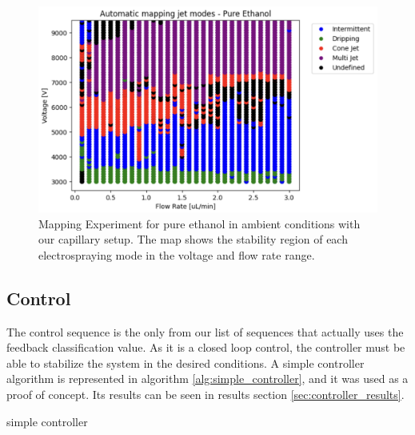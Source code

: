     \begin{figure}[H]
        \center
        \includegraphics[width=15cm]{Figuras/report4/map-2023-03-02.png}
        \caption{Mapping Experiment for pure ethanol in ambient conditions with our capillary setup. The map shows the stability region of each electrospraying mode in the voltage and flow rate range.}
        \label{fig:map3Data_fig}
    \end{figure}



\subsection{Control}

    The control sequence is the only from our list of sequences that actually uses the feedback classification value. 
    As it is a closed loop control, the controller must be able to stabilize the system in the desired conditions.
    A simple controller algorithm is represented in algorithm \ref{alg:simple_controller}, and it was used as a proof of concept.
    Its results can be seen in results section \ref{sec:controller_results}.

    \begin{algorithm}
        \caption{simple controller}\label{alg:simple_controller}
        \begin{algorithmic}
            
                \State {}
                \State {}
            \EndIf

        \EndFunction
        \end{algorithmic}
    \end{algorithm}



